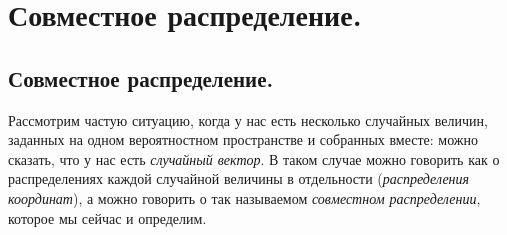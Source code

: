 \documentclass[../main.tex]{subfiles}
\begin{document}
\newpage
\section{Совместное распределение.}

\subsection{Совместное распределение.}

Рассмотрим частую ситуацию, когда у нас есть несколько случайных величин, заданных на одном вероятностном пространстве и собранных вместе: можно сказать, что у нас есть \textit{случайный вектор}. В таком случае можно говорить как о распределениях каждой случайной величины в отдельности (\textit{распределения координат}), а можно говорить о так называемом \textit{совместном распределении}, которое мы сейчас и определим.
\end{document}
